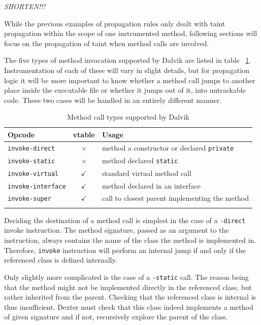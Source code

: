 \documentclass[12pt,twoside,notitlepage]{report}
\newcommand{\tick}{$\checkmark$}
\newcommand{\cross}{$\times$}
\begin{document}
\emph{SHORTEN!!!}

While the previous examples of propagation rules only dealt with taint propagation within the scope of one instrumented method, following sections will focus on the propagation of taint when method calls are involved. 

The five types of method invocation supported by Dalvik are listed in table ~\ref{table:TaintPropagation_MethodCallTypes}. Instrumentation of each of these will vary in slight details, but for propagation logic it will be more important to know whether a method call jumps to another place inside the executable file or whether it jumps out of it, into untrackable code. These two cases will be handled in an entirely different manner. 

\begin{table}
	\begin{center}
	\begin{tabular}{|l|c|l|}
		\firsthline
		\textbf{Opcode}         & \footnotesize{\textbf{vtable}} & \textbf{Usage} \\
		\hline
		\verb$invoke-direct$    & \cross          & method a constructor or declared \verb$private$ \\
		\verb$invoke-static$    & \cross          & method declared \verb$static$ \\
		\hline
		\verb$invoke-virtual$   & \tick           & standard virtual method call \\
		\verb$invoke-interface$ & \tick           & method declared in an interface \\
		\verb$invoke-super$     & \tick           & call to closest parent implementing the method \\
		\lasthline
	\end{tabular}
	\end{center}
	\caption{Method call types supported by Dalvik}
	\label{table:TaintPropagation_MethodCallTypes}
\end{table}

Deciding the destination of a method call is simplest in the case of a \verb$-direct$ invoke instruction. The method signature, passed as an argument to the instruction, always contains the name of the class the method is implemented in. Therefore, \verb$invoke$ instruction will perform an internal jump if and only if the referenced class is defined internally.

Only slightly more complicated is the case of a \verb$-static$ call. The reason being that the method might not be implemented directly in the referenced class, but rather inherited from the parent. Checking that the referenced class is internal is thus insufficient. Dexter must check that this class indeed implements a method of given signature and if not, recursively explore the parent of the class. 
\end{document}
